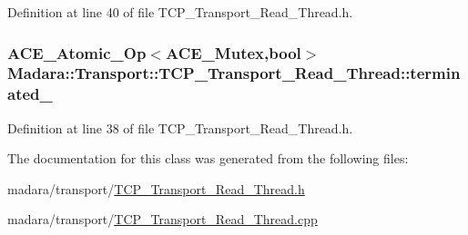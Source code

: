 Definition at line 40 of file TCP\_\-Transport\_\-Read\_\-Thread.h.

\hypertarget{classMadara_1_1Transport_1_1TCP__Transport__Read__Thread_a1ab73986d8410ec4472352fa5de6b3e7}{
\subsubsection[{terminated\_\-}]{\setlength{\rightskip}{0pt plus 5cm}ACE\_\-Atomic\_\-Op$<$ACE\_\-Mutex,bool$>$ {\bf Madara::Transport::TCP\_\-Transport\_\-Read\_\-Thread::terminated\_\-}}}
\label{d8/d4c/classMadara_1_1Transport_1_1TCP__Transport__Read__Thread_a1ab73986d8410ec4472352fa5de6b3e7}


Definition at line 38 of file TCP\_\-Transport\_\-Read\_\-Thread.h.



The documentation for this class was generated from the following files:\begin{DoxyCompactItemize}
\item 
madara/transport/\hyperlink{TCP__Transport__Read__Thread_8h}{TCP\_\-Transport\_\-Read\_\-Thread.h}\item 
madara/transport/\hyperlink{TCP__Transport__Read__Thread_8cpp}{TCP\_\-Transport\_\-Read\_\-Thread.cpp}\end{DoxyCompactItemize}
